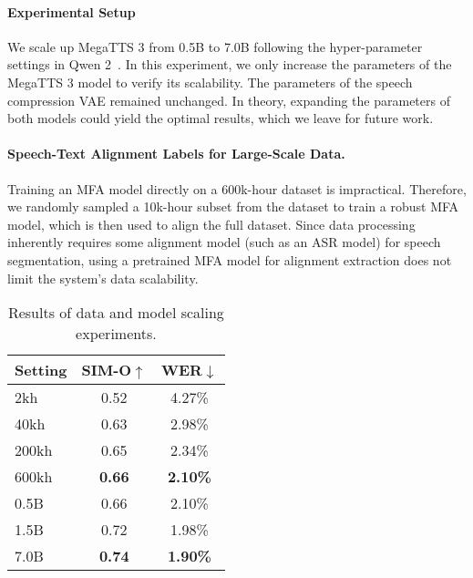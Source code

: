 \paragraph{Experimental Setup} We scale up MegaTTS 3 from 0.5B to 7.0B following the hyper-parameter settings in Qwen 2~\citep{yang2024qwen2}. In this experiment, we only increase the parameters of the MegaTTS 3 model to verify its scalability. The parameters of the speech compression VAE remained unchanged. In theory, expanding the parameters of both models could yield the optimal results, which we leave for future work.

\paragraph{Speech-Text Alignment Labels for Large-Scale Data.} Training an MFA model directly on a 600k-hour dataset is impractical. Therefore, we randomly sampled a 10k-hour subset from the dataset to train a robust MFA model, which is then used to align the full dataset. Since data processing inherently requires some alignment model (such as an ASR model) for speech segmentation, using a pretrained MFA model for alignment extraction does not limit the system's data scalability.


\begin{table}[!t]
\small
\centering
\begin{tabular}{@{}l|cc@{}}
\toprule
\bfseries Setting & \bfseries SIM-O$\uparrow$ & \bfseries WER$\downarrow$ \\       
\midrule
2kh   & 0.52           & 4.27\%                 \\
40kh  & 0.63           & 2.98\%                 \\
200kh & 0.65           & 2.34\%                 \\
600kh & \bfseries 0.66 & \bfseries 2.10\%       \\
\midrule
0.5B & 0.66           & 2.10\%                  \\
1.5B & 0.72           & 1.98\%                  \\
7.0B & \bfseries 0.74 & \bfseries 1.90\%        \\
\bottomrule
\end{tabular}
\caption{Results of data and model scaling experiments.}
\label{table:ablation_scalability}
\end{table}

